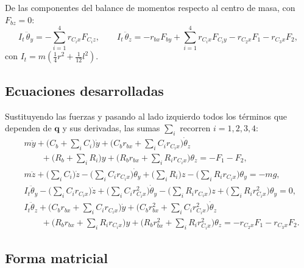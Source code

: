 De las componentes del balance de momentos respecto al centro de masa, con $F_{bz}=0$:
\[
I_t\,\ddot\theta_y=-\sum_{i=1}^4r_{C_ix}F_{C_iz},
\qquad
I_t\,\ddot\theta_z=-r_{bx}F_{by}+\sum_{i=1}^4r_{C_ix}F_{C_iy}-r_{C_2x}F_1-r_{C_3x}F_2,
\]
con $I_t=m\left(\tfrac14r^2+\tfrac1{12}l^2\right)$.

\subsection{Ecuaciones desarrolladas}

Sustituyendo las fuerzas y pasando al lado izquierdo todos los términos que dependen de $\mathbf q$ y sus derivadas, 
las sumas $\sum_i$ recorren $i=1,2,3,4$:
\begin{align*}
&m\ddot y+\Big(C_b+\sum_iC_i\Big)\dot y+\Big(C_br_{bx}+\sum_iC_ir_{C_ix}\Big)\dot\theta_z\\
&\qquad+\Big(R_b+\sum_iR_i\Big)y+\Big(R_br_{bx}+\sum_iR_ir_{C_ix}\Big)\theta_z=-F_1-F_2,\\[4pt]
&m\ddot z+\Big(\sum_iC_i\Big)\dot z-\Big(\sum_iC_ir_{C_ix}\Big)\dot\theta_y
+\Big(\sum_iR_i\Big)z-\Big(\sum_iR_ir_{C_ix}\Big)\theta_y=-mg,\\[4pt]
&I_t\ddot\theta_y-\Big(\sum_iC_ir_{C_ix}\Big)\dot z+\Big(\sum_iC_ir_{C_ix}^2\Big)\dot\theta_y
-\Big(\sum_iR_ir_{C_ix}\Big)z+\Big(\sum_iR_ir_{C_ix}^2\Big)\theta_y=0,\\[4pt]
&I_t\ddot\theta_z+\Big(C_br_{bx}+\sum_iC_ir_{C_ix}\Big)\dot y+\Big(C_br_{bx}^2+\sum_iC_ir_{C_ix}^2\Big)\dot\theta_z\\
&\qquad+\Big(R_br_{bx}+\sum_iR_ir_{C_ix}\Big)y+\Big(R_br_{bx}^2+\sum_iR_ir_{C_ix}^2\Big)\theta_z=-r_{C_2x}F_1-r_{C_3x}F_2 .
\end{align*}

\subsection{Forma matricial}

